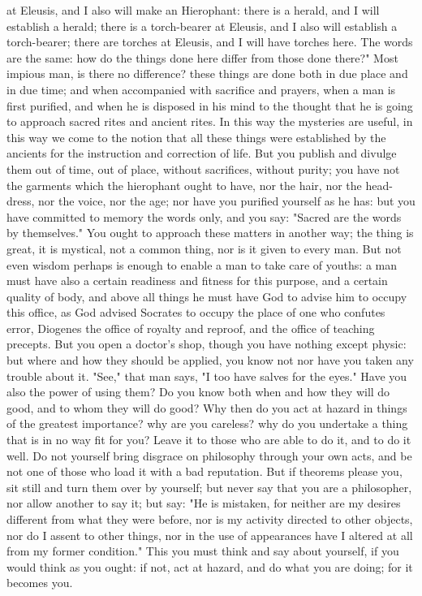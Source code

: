 \documentclass[a4paper]{article}
\begin{document}
at Eleusis, and I also will make an Hierophant: there is a herald, and I will
establish a herald; there is a torch-bearer at Eleusis, and I also will
establish a torch-bearer; there are torches at Eleusis, and I will have torches
here. The words are the same: how do the things done here differ from those
done there?" Most impious man, is there no difference? these things are done
both in due place and in due time; and when accompanied with sacrifice and
prayers, when a man is first purified, and when he is disposed in his mind to
the thought that he is going to approach sacred rites and ancient rites. In
this way the mysteries are useful, in this way we come to the notion that all
these things were established by the ancients for the instruction and
correction of life. But you publish and divulge them out of time, out of place,
without sacrifices, without purity; you have not the garments which the
hierophant ought to have, nor the hair, nor the head-dress, nor the voice, nor
the age; nor have you purified yourself as he has: but you have committed to
memory the words only, and you say: "Sacred are the words by themselves."
    You ought to approach these matters in another way; the thing is great, it
is mystical, not a common thing, nor is it given to every man. But not even
wisdom perhaps is enough to enable a man to take care of youths: a man must
have also a certain readiness and fitness for this purpose, and a certain
quality of body, and above all things he must have God to advise him to occupy
this office, as God advised Socrates to occupy the place of one who confutes
error, Diogenes the office of royalty and reproof, and the office of teaching
precepts. But you open a doctor's shop, though you have nothing except physic:
but where and how they should be applied, you know not nor have you taken any
trouble about it. "See," that man says, "I too have salves for the eyes." Have
you also the power of using them? Do you know both when and how they will do
good, and to whom they will do good? Why then do you act at hazard in things of
the greatest importance? why are you careless? why do you undertake a thing
that is in no way fit for you? Leave it to those who are able to do it, and to
do it well. Do not yourself bring disgrace on philosophy through your own acts,
and be not one of those who load it with a bad reputation. But if theorems
please you, sit still and turn them over by yourself; but never say that you
are a philosopher, nor allow another to say it; but say: "He is mistaken, for
neither are my desires different from what they were before, nor is my activity
directed to other objects, nor do I assent to other things, nor in the use of
appearances have I altered at all from my former condition." This you must
think and say about yourself, if you would think as you ought: if not, act at
hazard, and do what you are doing; for it becomes you.
\end{document}
